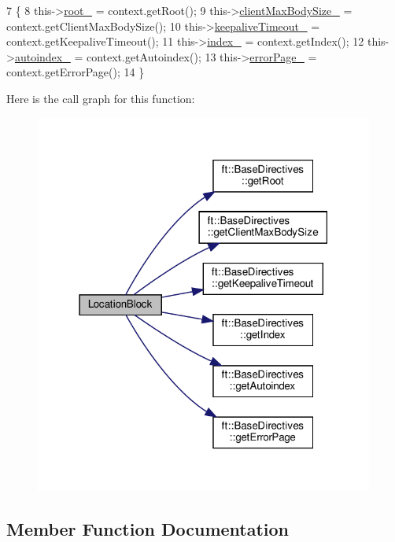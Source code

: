 \begin{DoxyCode}
7     \{
8         this->\hyperlink{classft_1_1_base_directives_abb1eaf0bba10b90172d6152e69457dc7}{root\_} = context.getRoot();
9         this->\hyperlink{classft_1_1_base_directives_ad65c2594d2a90ca065d410dfd4066a19}{clientMaxBodySize\_} = context.getClientMaxBodySize();
10         this->\hyperlink{classft_1_1_base_directives_aa1f5f394b428d0d18765a9b9e14e648f}{keepaliveTimeout\_} = context.getKeepaliveTimeout();
11         this->\hyperlink{classft_1_1_base_directives_a6ba30626837f300201cd32c35d50aa49}{index\_} = context.getIndex();
12         this->\hyperlink{classft_1_1_base_directives_a4ebffbe32f50a462afa139c6f03c1a4f}{autoindex\_} = context.getAutoindex();
13         this->\hyperlink{classft_1_1_base_directives_a5c0d388109f086503961de84fe3fce90}{errorPage\_} = context.getErrorPage();
14     \}
\end{DoxyCode}
Here is the call graph for this function\+:\nopagebreak
\begin{figure}[H]
\begin{center}
\leavevmode
\includegraphics[width=316pt]{classft_1_1_location_block_a28cbc9fd5dfde06685c8f7be5b6e0a4a_cgraph}
\end{center}
\end{figure}


\subsection{Member Function Documentation}
\mbox{\label{classft_1_1_base_directives_a36d96dc74e650162c25a325813130ab2}} 
